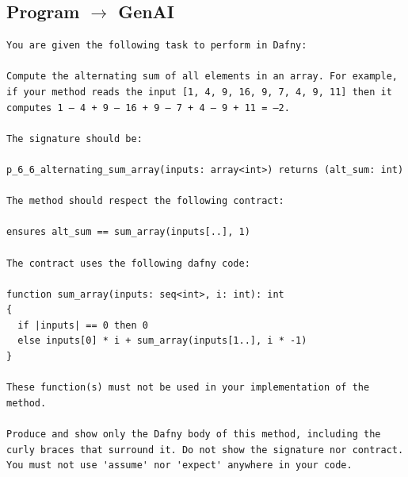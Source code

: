 \documentclass{article}
\begin{document}
\subsection*{Program $\rightarrow$ GenAI}
\begin{lstlisting}
You are given the following task to perform in Dafny:

Compute the alternating sum of all elements in an array. For example, if your method reads the input [1, 4, 9, 16, 9, 7, 4, 9, 11] then it computes 1 – 4 + 9 – 16 + 9 – 7 + 4 – 9 + 11 = –2.

The signature should be:

p_6_6_alternating_sum_array(inputs: array<int>) returns (alt_sum: int)

The method should respect the following contract:

ensures alt_sum == sum_array(inputs[..], 1)

The contract uses the following dafny code:

function sum_array(inputs: seq<int>, i: int): int
{
  if |inputs| == 0 then 0
  else inputs[0] * i + sum_array(inputs[1..], i * -1)
}

These function(s) must not be used in your implementation of the method.

Produce and show only the Dafny body of this method, including the curly braces that surround it. Do not show the signature nor contract. You must not use 'assume' nor 'expect' anywhere in your code.
\end{lstlisting}
\end{document}
